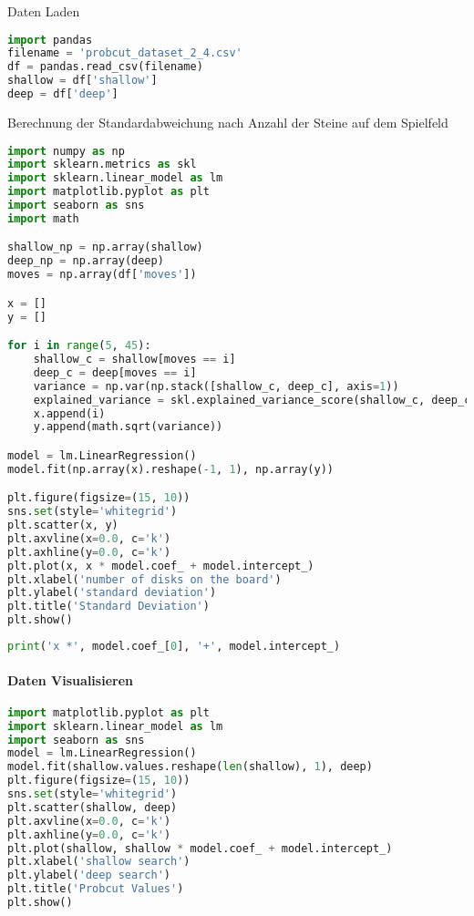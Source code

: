 Daten Laden

\begin{lstlisting}[language=Python]
import pandas
filename = 'probcut_dataset_2_4.csv'
df = pandas.read_csv(filename)
shallow = df['shallow']
deep = df['deep']
\end{lstlisting}

Berechnung der Standardabweichung nach Anzahl der Steine auf dem
Spielfeld

\begin{lstlisting}[language=Python]
import numpy as np
import sklearn.metrics as skl
import sklearn.linear_model as lm
import matplotlib.pyplot as plt
import seaborn as sns
import math

shallow_np = np.array(shallow)
deep_np = np.array(deep)
moves = np.array(df['moves'])

x = []
y = []

for i in range(5, 45):
    shallow_c = shallow[moves == i]
    deep_c = deep[moves == i]
    variance = np.var(np.stack([shallow_c, deep_c], axis=1))
    explained_variance = skl.explained_variance_score(shallow_c, deep_c)
    x.append(i)
    y.append(math.sqrt(variance))

model = lm.LinearRegression()
model.fit(np.array(x).reshape(-1, 1), np.array(y))

plt.figure(figsize=(15, 10))
sns.set(style='whitegrid')
plt.scatter(x, y)
plt.axvline(x=0.0, c='k')
plt.axhline(y=0.0, c='k')
plt.plot(x, x * model.coef_ + model.intercept_)
plt.xlabel('number of disks on the board')
plt.ylabel('standard deviation')
plt.title('Standard Deviation')
plt.show()
\end{lstlisting}

\begin{lstlisting}[language=Python]
print('x *', model.coef_[0], '+', model.intercept_)
\end{lstlisting}

\hypertarget{daten-visualisieren}{%
\paragraph{Daten Visualisieren}\label{daten-visualisieren}}

\begin{lstlisting}[language=Python]
import matplotlib.pyplot as plt
import sklearn.linear_model as lm
import seaborn as sns
model = lm.LinearRegression()
model.fit(shallow.values.reshape(len(shallow), 1), deep)
plt.figure(figsize=(15, 10))
sns.set(style='whitegrid')
plt.scatter(shallow, deep)
plt.axvline(x=0.0, c='k')
plt.axhline(y=0.0, c='k')
plt.plot(shallow, shallow * model.coef_ + model.intercept_)
plt.xlabel('shallow search')
plt.ylabel('deep search')
plt.title('Probcut Values')
plt.show()
\end{lstlisting}


